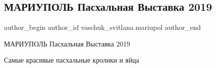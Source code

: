  
 
 
 
 
 
\subsection{МАРИУПОЛЬ Пасхальная Выставка 2019}
\label{sec:03_05_2019.fb.vaschuk_svitlana.mariupol.1.pashalnaja_vystavka}
 
\ifcmt
 author_begin
   author_id vaschuk_svitlana.mariupol
 author_end
\fi

МАРИУПОЛЬ Пасхальная Выставка 2019

Самые красивые пасхальные кролики и яйца
